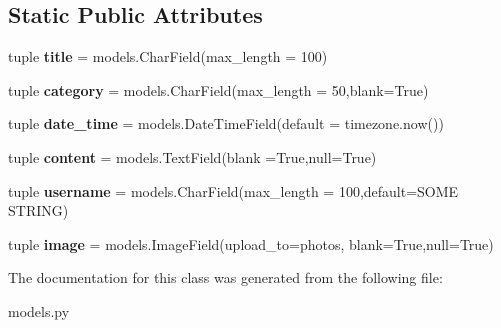 \subsection*{Static Public Attributes}
\begin{DoxyCompactItemize}
\item 
\hypertarget{classarticle_1_1models_1_1Article_a94ddfc04825577cafc687f5cec3242f0}{}tuple {\bfseries title} = models.\+Char\+Field(max\+\_\+length = 100)\label{classarticle_1_1models_1_1Article_a94ddfc04825577cafc687f5cec3242f0}

\item 
\hypertarget{classarticle_1_1models_1_1Article_af63605372e5e04d50afbcf885a322a83}{}tuple {\bfseries category} = models.\+Char\+Field(max\+\_\+length = 50,blank=True)\label{classarticle_1_1models_1_1Article_af63605372e5e04d50afbcf885a322a83}

\item 
\hypertarget{classarticle_1_1models_1_1Article_a6d090daa50c903645de2b93db914fc8e}{}tuple {\bfseries date\+\_\+time} = models.\+Date\+Time\+Field(default = timezone.\+now())\label{classarticle_1_1models_1_1Article_a6d090daa50c903645de2b93db914fc8e}

\item 
\hypertarget{classarticle_1_1models_1_1Article_a88570c13409c321dc73630797411b99d}{}tuple {\bfseries content} = models.\+Text\+Field(blank =True,null=True)\label{classarticle_1_1models_1_1Article_a88570c13409c321dc73630797411b99d}

\item 
\hypertarget{classarticle_1_1models_1_1Article_af26f156302a0b4e467b8af91f493b095}{}tuple {\bfseries username} = models.\+Char\+Field(max\+\_\+length = 100,default=\textquotesingle{}S\+O\+M\+E S\+T\+R\+I\+N\+G\textquotesingle{})\label{classarticle_1_1models_1_1Article_af26f156302a0b4e467b8af91f493b095}

\item 
\hypertarget{classarticle_1_1models_1_1Article_a85b36fb0f467c7c7d9416def1e1cb601}{}tuple {\bfseries image} = models.\+Image\+Field(upload\+\_\+to=\textquotesingle{}photos\textquotesingle{}, blank=True,null=True)\label{classarticle_1_1models_1_1Article_a85b36fb0f467c7c7d9416def1e1cb601}

\end{DoxyCompactItemize}


The documentation for this class was generated from the following file\+:\begin{DoxyCompactItemize}
\item 
models.\+py\end{DoxyCompactItemize}
